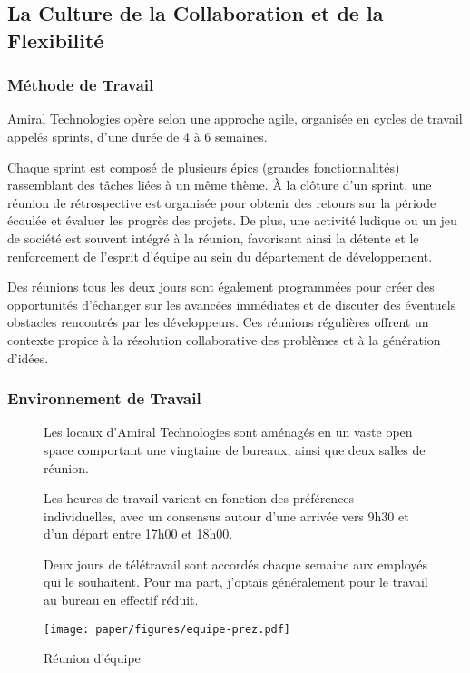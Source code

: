 \subsection*{La Culture de la Collaboration et de la Flexibilité}
\subsubsection{Méthode de Travail}
Amiral Technologies opère selon une approche agile, organisée en cycles de travail appelés sprints, d'une durée de 4 à 6 semaines.

Chaque sprint est composé de plusieurs épics (grandes fonctionnalités) rassemblant des tâches liées à un même thème.
À la clôture d'un sprint, une réunion de rétrospective est organisée pour obtenir des retours sur la période écoulée et évaluer les progrès des projets.
De plus, une activité ludique ou un jeu de société est souvent intégré à la réunion, favorisant ainsi la détente et le renforcement de l'esprit d'équipe au sein du département de développement.

Des réunions tous les deux jours sont également programmées pour créer des opportunités d'échanger sur les avancées immédiates et de discuter des éventuels obstacles rencontrés par les développeurs.
Ces réunions régulières offrent un contexte propice à la résolution collaborative des problèmes et à la génération d'idées.


\subsubsection{Environnement de Travail}
\begin{figure}[ht!]
    \begin{minipage}[c]{0.475\textwidth}
        Les locaux d'Amiral Technologies sont aménagés en un vaste open space comportant une vingtaine de bureaux, ainsi que deux salles de réunion.
        
        Les heures de travail varient en fonction des préférences individuelles, avec un consensus autour d'une arrivée vers 9h30 et d'un départ entre 17h00 et 18h00.
        
        Deux jours de télétravail sont accordés chaque semaine aux employés qui le souhaitent.
        Pour ma part, j'optais généralement pour le travail au bureau en effectif réduit.
    \end{minipage} %
    \begin{minipage}[c]{0.05\textwidth}
        \hfill
    \end{minipage} %
    \begin{minipage}[c]{0.475\textwidth}
        \centering
        \texttt{[image: paper/figures/equipe-prez.pdf]}
        \caption{Réunion d'équipe}
    \end{minipage}
\end{figure}